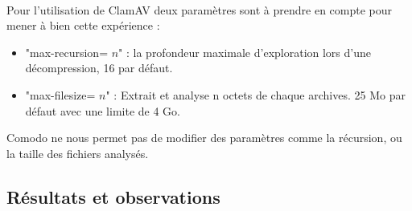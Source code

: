 \documentclass{svjour3}
\begin{document}
\\Pour l'utilisation de ClamAV deux paramètres sont à prendre en compte pour mener à bien cette expérience :
\begin{itemize}
\item "max-recursion= $n$" : la profondeur maximale d'exploration lors d'une décompression, 16 par défaut.
\item "max-filesize= $n$" : Extrait et analyse  n octets de chaque archives. 25 Mo par défaut avec une limite de 4 Go.
\end{itemize}
Comodo ne nous permet pas de modifier des paramètres comme la récursion, ou la taille des fichiers analysés.

\subsection{Résultats et observations}
\label{3.2résultats}
\end{document}
